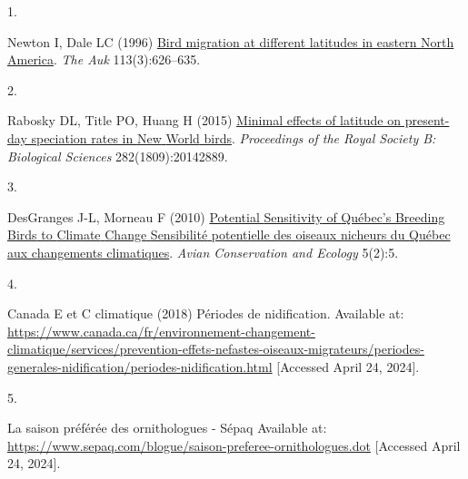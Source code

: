 \documentclass[9pt,twocolumn,twoside,]{pnas-new}
\newlength{\cslhangindent}
\newlength{\csllabelwidth}
\newlength{\cslentryspacingunit} %
\newenvironment{CSLReferences}[2] %
 {%
  \setlength{\parindent}{0pt}
  \ifodd #1
  \let\oldpar\par
  \def\par{\hangindent=\cslhangindent\oldpar}
  \fi
  \setlength{\parskip}{#2\cslentryspacingunit}
 }%
 {}
\newcommand{\CSLLeftMargin}[1]{\parbox[t]{\csllabelwidth}{#1}}
\newcommand{\CSLRightInline}[1]{\parbox[t]{\linewidth - \csllabelwidth}{#1}\break}
\begin{document}
\hypertarget{refs}{}
\begin{CSLReferences}{0}{0}
\leavevmode{}%
\CSLLeftMargin{1. }%
\CSLRightInline{Newton I, Dale LC (1996)
\href{https://academic.oup.com/auk/article-abstract/113/3/626/5168287}{Bird
migration at different latitudes in eastern {North} {America}}.
\emph{The Auk} 113(3):626--635.}

\leavevmode{}%
\CSLLeftMargin{2. }%
\CSLRightInline{Rabosky DL, Title PO, Huang H (2015)
\href{https://doi.org/10.1098/rspb.2014.2889}{Minimal effects of
latitude on present-day speciation rates in {New} {World} birds}.
\emph{Proceedings of the Royal Society B: Biological Sciences}
282(1809):20142889.}

\leavevmode{}%
\CSLLeftMargin{3. }%
\CSLRightInline{DesGranges J-L, Morneau F (2010)
\href{https://www.researchgate.net/profile/Francois-Morneau-5/publication/271297003_Potential_Sensitivity_of_Quebec\textquotesingle{}s_Breeding_Birds_to_Climate_Change/links/654d3ca0b86a1d521bc88312/Potential-Sensitivity-of-Quebecs-Breeding-Birds-to-Climate-Change.pdf}{Potential
{Sensitivity} of {Québec}'s {Breeding} {Birds} to {Climate} {Change}
{Sensibilité} potentielle des oiseaux nicheurs du {Québec} aux
changements climatiques}. \emph{Avian Conservation and Ecology} 5(2):5.}

\leavevmode{}%
\CSLLeftMargin{4. }%
\CSLRightInline{Canada E et C climatique (2018) Périodes de
nidification. Available at:
\url{https://www.canada.ca/fr/environnement-changement-climatique/services/prevention-effets-nefastes-oiseaux-migrateurs/periodes-generales-nidification/periodes-nidification.html}
{[}Accessed April 24, 2024{]}.}

\leavevmode{}%
\CSLLeftMargin{5. }%
\CSLRightInline{La saison préférée des ornithologues - {Sépaq} Available
at: \url{https://www.sepaq.com/blogue/saison-preferee-ornithologues.dot}
{[}Accessed April 24, 2024{]}.}

\end{CSLReferences}



% 
\end{document}

